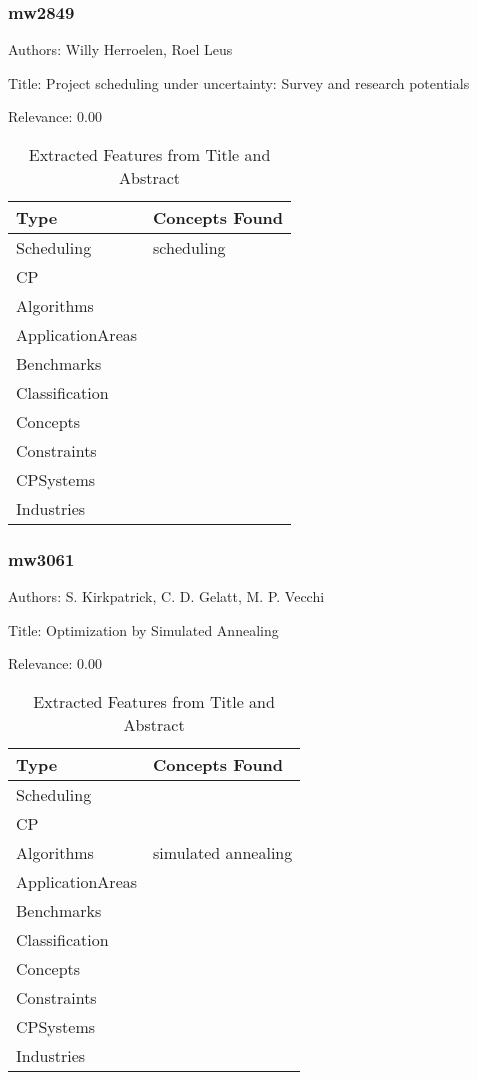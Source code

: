 \subsubsection{mw2849}
\label{mw:mw2849}

Authors: Willy Herroelen, Roel Leus

Title: Project scheduling under uncertainty: Survey and research potentials

Relevance:  0.00

{\scriptsize
\begin{longtable}{p{2cm}p{20cm}}
\caption{Extracted Features from Title and Abstract}\\ \toprule
Type & Concepts Found\\ \midrule
\endhead
\bottomrule
\endfoot
Scheduling & scheduling\\ 
CP & \\ 
Algorithms & \\ 
ApplicationAreas & \\ 
Benchmarks & \\ 
Classification & \\ 
Concepts & \\ 
Constraints & \\ 
CPSystems & \\ 
Industries & \\ 
\end{longtable}
}



\subsubsection{mw3061}
\label{mw:mw3061}

Authors: S. Kirkpatrick, C. D. Gelatt, M. P. Vecchi

Title: Optimization by Simulated Annealing

Relevance:  0.00

{\scriptsize
\begin{longtable}{p{2cm}p{20cm}}
\caption{Extracted Features from Title and Abstract}\\ \toprule
Type & Concepts Found\\ \midrule
\endhead
\bottomrule
\endfoot
Scheduling & \\ 
CP & \\ 
Algorithms & simulated annealing\\ 
ApplicationAreas & \\ 
Benchmarks & \\ 
Classification & \\ 
Concepts & \\ 
Constraints & \\ 
CPSystems & \\ 
Industries & \\ 
\end{longtable}
}

